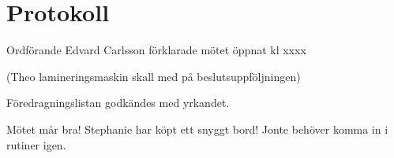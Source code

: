 \documentclass[10pt]{article}
\def\mo{Edvard Carlsson}
\begin{document}
\section*{Protokoll}
\begin{paragrafer}
Ordförande {\mo} förklarade mötet öppnat kl xxxx

{\valavmo}

{\valavms}

{\valavj}

{\tosg}






(Theo lamineringsmaskin skall med på beslutsuppföljningen)

Föredragningslistan godkändes med yrkandet.



\begin{fyllnadsval} %


\end{fyllnadsval}

\begin{paragrafer}
Mötet mår bra! Stephanie har köpt ett snyggt bord!
Jonte behöver komma in i rutiner igen. 



\end{paragrafer}
\end{paragrafer}
\end{document}
